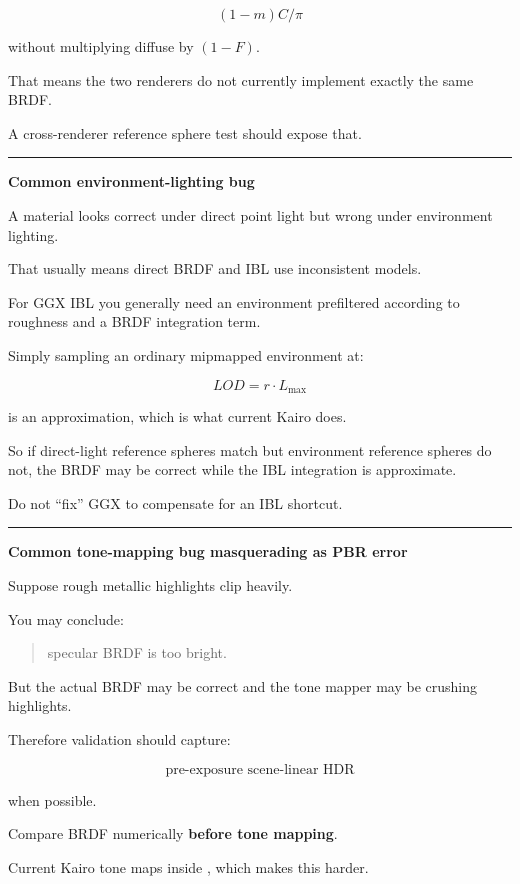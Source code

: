 \[
(1-m)C/\pi
\]

without multiplying diffuse by \((1-F)\).

That means the two renderers do not currently implement exactly the same BRDF.

A cross-renderer reference sphere test should expose that.

\begin{center}\rule{0.5\linewidth}{0.5pt}\end{center}

\textbf{Common environment-lighting bug}

A material looks correct under direct point light but wrong under environment lighting.

That usually means direct BRDF and IBL use inconsistent models.

For GGX IBL you generally need an environment prefiltered according to roughness and a BRDF integration term.

Simply sampling an ordinary mipmapped environment at:

\[
LOD=r\cdot L_{\max}
\]

is an approximation, which is what current Kairo does.

So if direct-light reference spheres match but environment reference spheres do not, the BRDF may be correct while the IBL integration is approximate.

Do not ``fix'' GGX to compensate for an IBL shortcut.

\begin{center}\rule{0.5\linewidth}{0.5pt}\end{center}

\textbf{Common tone-mapping bug masquerading as PBR error}

Suppose rough metallic highlights clip heavily.

You may conclude:

\begin{quote}
specular BRDF is too bright.
\end{quote}

But the actual BRDF may be correct and the tone mapper may be crushing highlights.

Therefore validation should capture:

\[
\text{pre-exposure scene-linear HDR}
\]

when possible.

Compare BRDF numerically \textbf{before tone mapping}.

Current Kairo tone maps inside , which makes this harder.

